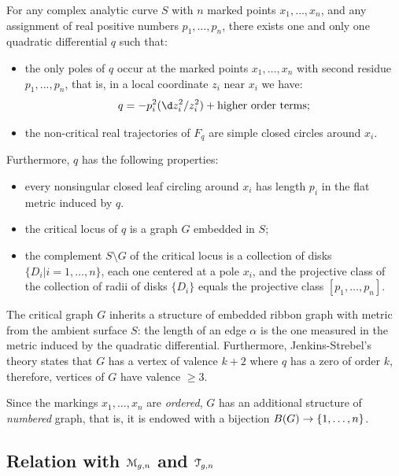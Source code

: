 \begin{theorem} 
  \label{thm:JS}
  For any complex analytic curve $S$ with $n$ marked points $x_1, \ldots,
  x_n$, and any assignment of real positive numbers $p_1, \ldots, p_n$,
  there exists one and only one quadratic differential $q$ such that:
  \begin{itemize}
  \item the only poles of $q$ occur at the marked points $x_1, \ldots, x_n$
    with second residue $p_1, ..., p_n$, that is, in a local
    coordinate $z_i$ near $x_i$ we have:
    \begin{equation*}
      q = -p_i^2 (\d z_i^2 / z_i^2) + \text{higher order terms};
    \end{equation*}
  \item the non-critical real trajectories of $F_q$ are simple closed
    circles around $x_i$.
  \end{itemize}
  Furthermore, $q$ has the following properties:
  \begin{itemize}
  \item every nonsingular closed leaf circling around $x_i$ has length
    $p_i$ in the flat metric induced by $q$.
  \item the critical locus of $q$ is a graph $G$ embedded in $S$;
  \item the complement $S \setminus G$ of the critical locus is a collection
    of disks $\{D_i | i=1,\ldots,n\}$, each one centered at a pole $x_i$, and
    the projective class of the collection of radii of disks $\{D_i\}$
    equals the projective class $[p_1, \ldots, p_n]$.
  \end{itemize}
\end{theorem}
The critical graph $G$ inherits a structure of embedded ribbon graph
with metric from the ambient surface $S$: the length of an edge $\alpha$ is
the one measured in the metric induced by the quadratic differential.
Furthermore, Jenkins-Strebel's theory states that $G$ has a vertex of
valence $k+2$ where $q$ has a zero of order $k$, therefore, vertices
of $G$ have valence $\geq3$. 

Since the markings $x_1, \ldots, x_n$ are \emph{ordered}, $G$ has an
additional structure of \emph{numbered} graph, that is, it is endowed
with a bijection $B(G) \to \{1, \ldots, n\}$.


\subsection{Relation with $\mathcal{M}_{g,n}$ and $\mathcal{T}_{g,n}$}
\label{sec:nocomb}

